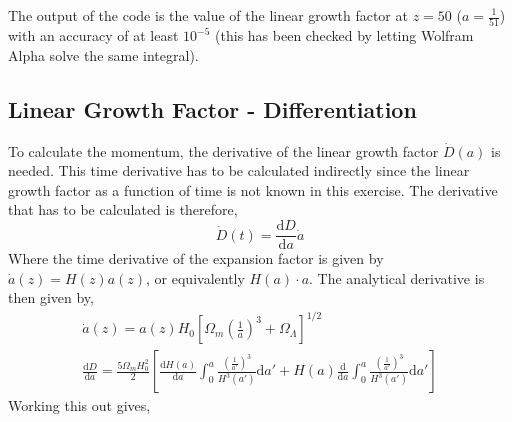 
The output of the code is the value of the linear growth factor at $z = 50$ ($a = \frac{1}{51}$) with an accuracy of at least $10^{-5}$ (this has been checked by letting Wolfram Alpha solve the same integral).



\subsection{Linear Growth Factor - Differentiation}

To calculate the momentum, the derivative of the linear growth factor $\dot{D}(a)$ is needed. This time derivative has to be calculated indirectly since the linear growth factor as a function of time is not known in this exercise. The derivative that has to be calculated is therefore,
\begin{equation*}
\dot{D} (t) = \frac{\mathrm{d}D}{\mathrm{d}a}\dot{a}
\end{equation*}
Where the time derivative of the expansion factor is given by $\dot{a}(z) = H(z) a(z)$, or equivalently $H(a)\cdot a$. The analytical derivative is then given by,
\begin{gather*}
\dot{a}(z) = a(z) H_0\left[\Omega_m\left(\frac{1}{a}\right)^3 + \Omega_{\Lambda}\right]^{1/2}\\
\frac{\mathrm{d}D}{\mathrm{d}a} = \frac{5\Omega_m H_0^2}{2}\left[\frac{\mathrm{d}H(a)}{\mathrm{d}a }\int_0^a\frac{\left(\frac{1}{a'}\right)^3}{H^3(a')}\mathrm{d}a'+ H(a)\frac{\mathrm{d}}{\mathrm{d}a}\int_0^a\frac{\left(\frac{1}{a'}\right)^3}{H^3(a')}\mathrm{d}a'\right] 
\end{gather*}
Working this out gives,
